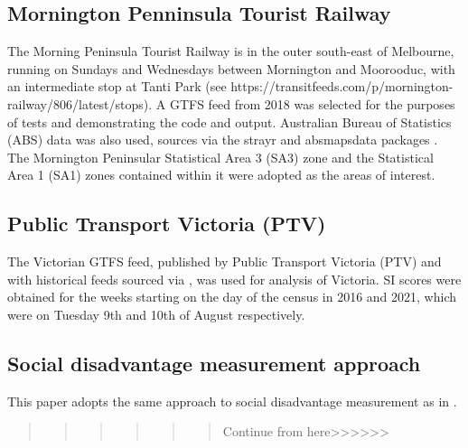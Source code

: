\documentclass[preprint, 3p,
authoryear]{elsarticle} %
\begin{document}
\hypertarget{mornington-penninsula-tourist-railway}{%
\subsection{Mornington Penninsula Tourist
Railway}\label{mornington-penninsula-tourist-railway}}

The Morning Peninsula Tourist Railway is in the outer south-east of
Melbourne, running on Sundays and Wednesdays between Mornington and
Moorooduc, with an intermediate stop at Tanti Park (see
https://transitfeeds.com/p/mornington-railway/806/latest/stops). A GTFS
feed from 2018 was selected for the purposes of tests and demonstrating
the code and output. Australian Bureau of Statistics (ABS) data was also
used, sources via the strayr and absmapsdata packages \citep{r-strayr}.
The Mornington Peninsular Statistical Area 3 (SA3) zone and the
Statistical Area 1 (SA1) zones contained within it were adopted as the
areas of interest.

\hypertarget{public-transport-victoria-ptv}{%
\subsection{Public Transport Victoria
(PTV)}\label{public-transport-victoria-ptv}}

The Victorian GTFS feed, published by Public Transport Victoria (PTV)
and with historical feeds sourced via
\citet{transitfeeds_victoria:2023aa}, was used for analysis of Victoria.
SI scores were obtained for the weeks starting on the day of the census
in 2016 and 2021, which were on Tuesday 9th and 10th of August
respectively.

\hypertarget{social-disadvantage-measurement-approach}{%
\subsection{Social disadvantage measurement
approach}\label{social-disadvantage-measurement-approach}}

This paper adopts the same approach to social disadvantage measurement
as in \citet{currie2010identifying}.

\begin{quote}
\begin{quote}
\begin{quote}
\begin{quote}
\begin{quote}
\begin{quote}
Continue from
here\textgreater\textgreater\textgreater\textgreater\textgreater\textgreater{}
\end{quote}
\end{quote}
\end{quote}
\end{quote}
\end{quote}
\end{quote}
\end{document}
